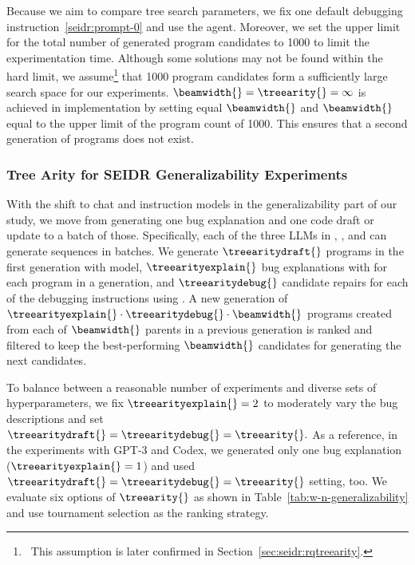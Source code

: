 Because we aim to compare tree search parameters, we fix one default debugging instruction~\ref{seidr:prompt-0} and use the \instructs{} agent.  
Moreover, we set the upper limit for the total number of generated program candidates to 1000 to limit the experimentation time. 
Although some solutions may not be found within the hard limit, we assume\footnote{~This assumption is later confirmed in Section~\ref{sec:seidr:rqtreearity}.} that 1000 program candidates form a sufficiently large search space for our experiments.
$\beamwidth{} = \treearity{} = \infty$ is achieved in implementation by setting equal $\beamwidth{}$ and $\beamwidth{}$ equal to the upper limit of the program count of 1000.
This ensures that a second generation of programs does not exist.


\subsubsection{Tree Arity for SEIDR Generalizability Experiments}
\label{sec:tree arity-ollama} 
With the shift to chat and instruction models in the generalizability part of our study, we move from generating one bug explanation and one code draft or update to a batch of those. 
Specifically, each of the three LLMs in \synthesize{}, \instruct{}, and \debug{}  can generate sequences in batches. 
We generate $\treearitydraft{}$ programs in the first generation with \synthmodelnoargs{} model, $\treearityexplain{}$ bug explanations with \textmodelnoargs{} for each program in a generation, and $\treearitydebug{}$ candidate repairs for each of the debugging instructions using \debugmodelnoargs{}.
A new generation of $\treearityexplain{} \cdot \treearitydebug{} \cdot \beamwidth{}$ programs created from each of $ \beamwidth{}$ parents in a previous generation is ranked and filtered to keep the best-performing $\beamwidth{}$ candidates for generating the next candidates. 

To balance between a reasonable number of experiments and diverse sets of hyperparameters, we fix $\treearityexplain{}=2$ to moderately vary the bug descriptions and set $\treearitydraft{} = \treearitydebug{} = \treearity{}.$
As a reference, in the experiments with GPT-3 and Codex, we generated only one bug explanation ($\treearityexplain{} = 1$) and used $\treearitydraft{} = \treearitydebug{} = \treearity{}$ setting, too. 
We evaluate six options of $\treearity{}$ 
as shown in Table~\ref{tab:w-n-generalizability} and use tournament selection as the ranking strategy. 

